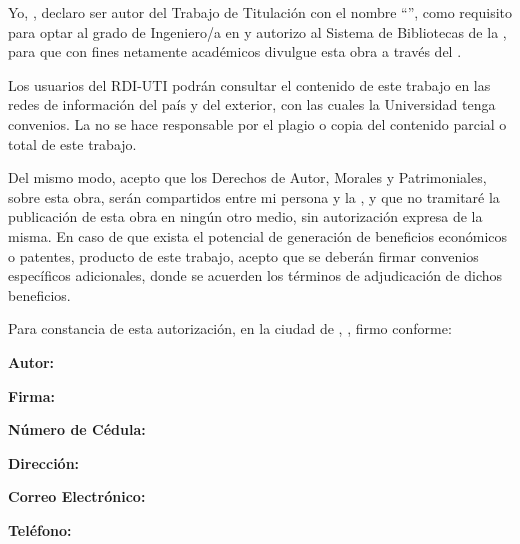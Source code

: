 \clearpage
{}
\begingroup\small
Yo, \Autor, declaro ser autor del Trabajo de Titulación con el nombre
``\TemaTexto'', como requisito para optar al grado de Ingeniero/a en
\CarreraNombre{} y autorizo al Sistema de Bibliotecas de la
\UniversidadNombre, para que con fines netamente académicos divulgue esta obra
a través del \Repositorio.

Los usuarios del RDI-UTI podrán consultar el contenido de este trabajo en las
redes de información del país y del exterior, con las cuales la Universidad
tenga convenios. La \UniversidadNombre{} no se hace responsable por el plagio o
copia del contenido parcial o total de este trabajo.

Del mismo modo, acepto que los Derechos de Autor, Morales y Patrimoniales,
sobre esta obra, serán compartidos entre mi persona y la \UniversidadNombre,
y que no tramitaré la publicación de esta obra en ningún otro medio, sin
autorización expresa de la misma. En caso de que exista el potencial de
generación de beneficios económicos o patentes, producto de este trabajo,
acepto que se deberán firmar convenios específicos adicionales, donde se
acuerden los términos de adjudicación de dichos beneficios.

Para constancia de esta autorización, en la ciudad de \CiudadTexto,
\FechaAutorizacion, firmo conforme:

\vspace{6mm}
\noindent\textbf{Autor:} \Autor\par
\vspace{2mm}
\noindent\textbf{Firma:}\par
\vspace{2mm}
\noindent\textbf{Número de Cédula:} \Cedula\par
\vspace{2mm}
\noindent\textbf{Dirección:} \Direccion\par
\vspace{2mm}
\noindent\textbf{Correo Electrónico:} \Correo\par
\vspace{2mm}
\noindent\textbf{Teléfono:} \Telefono\par
\endgroup
